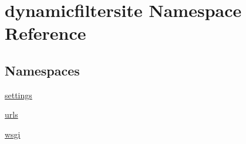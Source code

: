 \hypertarget{namespacedynamicfiltersite}{}\section{dynamicfiltersite Namespace Reference}
\label{namespacedynamicfiltersite}
\subsection*{Namespaces}
\begin{DoxyCompactItemize}
\item 
 \mbox{\hyperlink{namespacedynamicfiltersite_1_1settings}{settings}}
\item 
 \mbox{\hyperlink{namespacedynamicfiltersite_1_1urls}{urls}}
\item 
 \mbox{\hyperlink{namespacedynamicfiltersite_1_1wsgi}{wsgi}}
\end{DoxyCompactItemize}
